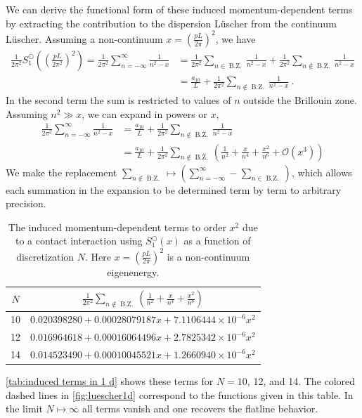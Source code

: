 We can derive the functional form of these induced momentum-dependent terms by extracting the contribution to the dispersion L\"uscher from the continuum L\"uscher.  Assuming a non-continuum $x=\left(\frac{pL}{2\pi}\right)^2$, we have
\begin{align*}
 \frac{1}{2 \pi^{2}} S^\bigcirc_{1}\left(\left(\frac{p L}{2 \pi^{2}}\right)^{2}\right)=\frac{1}{2 \pi^{2}} \sum_{n=-\infty}^{\infty} \frac{1}{n^{2}-x} &=\frac{1}{2 \pi^{2}} \sum_{n\in \operatorname{B.Z.}} \frac{1}{n^{2}-x} +\frac{1}{2 \pi^{2}} \sum_{n\notin \operatorname{B.Z.}} \frac{1}{n^{2}-x} \\
&=\frac{a_{10}}{L}+\frac{1}{2 \pi^{2}} \sum_{n\notin \operatorname{B.Z.}} \frac{1}{n^{2}-x} \ .
\end{align*}
In the second term the sum is restricted to values of $n$ outside the Brillouin zone.  Assuming $n^2\gg x$, we can expand in powers or $x$,
\begin{align*}
\frac{1}{2 \pi^{2}} \sum_{n=-\infty}^{\infty} \frac{1}{n^{2}-x} &=\frac{a_{10}}{L}+\frac{1}{2 \pi^{2}} \sum_{n\notin \operatorname{B.Z.}} \frac{1}{n^{2}-x} \\
&=\frac{a_{10}}{L}+\frac{1}{2 \pi^{2}} \sum_{n\notin \operatorname{B.Z.}} \left(\frac{1}{n^2}+\frac{x}{n^4}+\frac{x^2}{n^6}+\mathcal{O}(x^3)\right)
\end{align*}
We make the replacement $\sum_{n\notin\operatorname{B.Z.}}\mapsto\left(\sum_{n=-\infty}^\infty-\sum_{n\in\operatorname{B.Z.}}\right)$, which allows each summation in the expansion to be determined term by term to arbitrary precision.  
\begin{table}
\caption{The induced momentum-dependent terms to order $x^2$ due to a contact interaction using $S^\bigcirc_1(x)$ as a function of discretization $N$.  Here $x=\left(\frac{pL}{2\pi}\right)^2$ is a non-continuum eigenenergy.  \label{tab:induced terms in 1 d}}
\begin{tabular}{c|c}
$N$ & $\frac{1}{2 \pi^{2}} \sum_{n\notin \operatorname{B.Z.}} \left(\frac{1}{n^2}+\frac{x}{n^4}+\frac{x^2}{n^6}\right)$\\
\hline
10 &$0.020398280 + 0.00028079187 x + 7.1106444\times10^{-6} x^2$\\
12 &$0.016964618 + 0.00016064496 x + 2.7825342\times10^{-6} x^2$ \\
14 &$0.014523490 + 0.00010045521 x + 1.2660940\times10^{-6} x^2$ \\
\hline
\end{tabular}
\end{table}
\autoref{tab:induced terms in 1 d} shows these terms for $N=10$, 12, and 14.  The colored dashed lines in \autoref{fig:luescher1d} correspond to the functions given in this table.  In the limit $N\mapsto\infty$ all terms vanish and one recovers the flatline behavior.  
